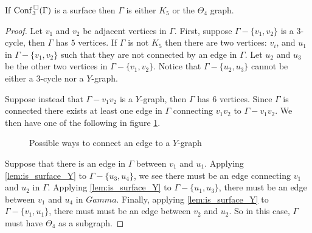 \begin{thm}
    If \(\mathrm{Conf}^{\,\square}_3(\Gamma)\) is a surface then \(\Gamma\) is either \(K_5\) or the \(\Theta_4\) graph.
\end{thm}
\begin{proof}
    Let \(v_1\) and \(v_2\) be adjacent vertices in \(\Gamma\).
    First, suppose \(\Gamma - \{v_1, v_2\}\) is a \(3\)-cycle, then \(\Gamma\) has \(5\) vertices.
    If \(\Gamma\) is not \(K_5\) then there are two vertices: \(v_i\), and \(u_1\) in \(\Gamma - \{v_1, v_2\}\)
    such that they are not connected by an edge in \(\Gamma\).
    Let \(u_2\) and \(u_3\) be the other two vertices in \(\Gamma - \{v_1, v_2\}\).
    Notice that \(\Gamma - \{u_2, u_3\}\) cannot be either a \(3\)-cycle nor a \(Y\)-graph.

    Suppose instead that \(\Gamma - v_1 v_2\) is a \(Y\)-graph, then \(\Gamma\) has \(6\) vertices.
    Since \(\Gamma\) is connected there exists at least one edge in \(\Gamma\) connecting \(v_1 v_2\) to \(\Gamma - v_1 v_2\).
    We then have one of the following in figure \ref{fig:edgeygraph}.
    \begin{figure}
        \centering
        \quad
        \caption{Possible ways to connect an edge to a \(Y\)-graph}
        \label{fig:edgeygraph}
    \end{figure}

    Suppose that there is an edge in \(\Gamma\) between \(v_1\) and \(u_1\).
    Applying \ref{lem:is_surface_Y} to \(\Gamma - \{u_3, u_4\}\), we see there must be an edge
    connecting \(v_1\) and \(u_2\) in \(\Gamma\).
    Applying \ref{lem:is_surface_Y} to \(\Gamma - \{u_1, u_3\}\), there must be an edge between
    \(v_1\) and \(u_4\) in \(Gamma\).
    Finally, applying \ref{lem:is_surface_Y} to \(\Gamma - \{v_1, u_1\}\), there must must be
    an edge between \(v_2\) and \(u_2\).
    So in this case, \(\Gamma\) must have \(\Theta_4\) as a subgraph.


\end{proof}
